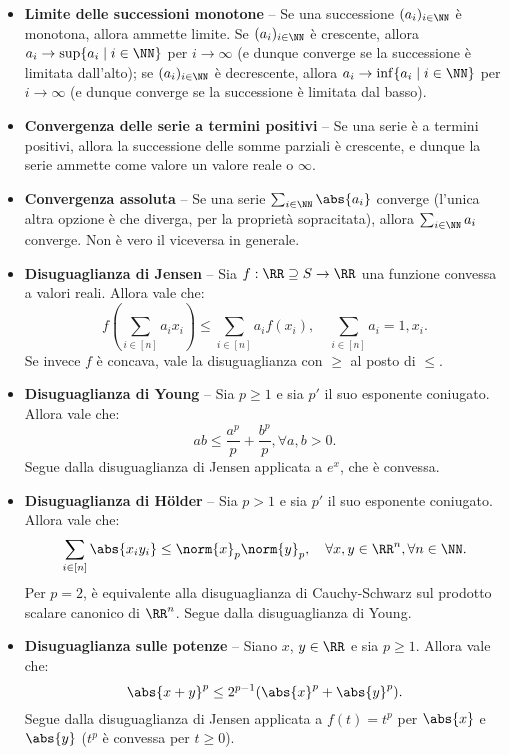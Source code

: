 \begin{multicols*}{2}
\begin{itemize}
    \item \textbf{Limite delle successioni monotone} -- Se una successione
    $(a_i)_{i \in \NN}$ è monotona, allora ammette limite. Se $(a_i)_{i \in \NN}$
    è crescente, allora $a_i \to \sup\{a_i \mid i \in \NN\}$ per $i \to \infty$ (e
    dunque converge se la successione è limitata dall'alto); se
    $(a_i)_{i \in \NN}$ è decrescente, allora $a_i \to \inf\{a_i \mid i \in \NN\}$ per $i \to \infty$ (e dunque converge se la successione è limitata dal basso).
    \item \textbf{Convergenza delle serie a termini positivi} -- Se una serie è
    a termini positivi, allora la successione delle somme parziali è crescente,
    e dunque la serie ammette come valore un valore reale o $\infty$.
    \item \textbf{Convergenza assoluta} -- Se una serie $\sum_{i \in \NN} \abs{a_i}$ converge
    (l'unica altra opzione è che diverga, per la proprietà sopracitata), allora
    $\sum_{i \in \NN} a_i$ converge. Non è vero il viceversa in generale.
    \item \textbf{Disuguaglianza di Jensen} -- Sia $f : \RR \supseteq S \to \RR$ una funzione convessa a
    valori reali. Allora vale che:
    \[
        f\left(\sum_{i \in [n]} a_i x_i\right) \leq \sum_{i \in [n]} a_i f(x_i), \quad \sum_{i \in [n]} a_i = 1, x_i.
    \]
    Se invece $f$ è concava, vale la disuguaglianza con $\geq$ al posto di $\leq$.
    \item \textbf{Disuguaglianza di Young} -- Sia $p \geq 1$ e sia $p'$ il
    suo esponente coniugato. Allora vale che:
    \[
        ab \leq \frac{a^p}{p} + \frac{b^p}{p}, \forall a, b > 0.
    \]
    Segue dalla disuguaglianza di Jensen applicata a $e^x$, che è convessa.
    \item \textbf{Disuguaglianza di Hölder} -- Sia $p > 1$ e sia $p'$ il
    suo esponente coniugato. Allora vale che:
    \[
        \sum_{i \in [n]} \abs{x_i y_i} \leq \norm{x}_p \norm{y}_p, \quad \forall x, y \in \RR^n, \forall n \in \NN.
    \]
    Per $p = 2$, è equivalente alla disuguaglianza di Cauchy-Schwarz sul
    prodotto scalare canonico di $\RR^n$. Segue dalla disuguaglianza di Young.
    \item \textbf{Disuguaglianza sulle potenze} -- Siano $x$, $y \in \RR$ e sia
    $p \geq 1$. Allora vale che:
    \[
        \abs{x+y}^p \leq 2^{p-1} (\abs{x}^p + \abs{y}^p).
    \]
    Segue dalla disuguaglianza di Jensen applicata a $f(t) = t^p$ per
    $\abs{x}$ e $\abs{y}$ ($t^p$ è convessa per $t \geq 0$).
\end{itemize}


\end{multicols*}
